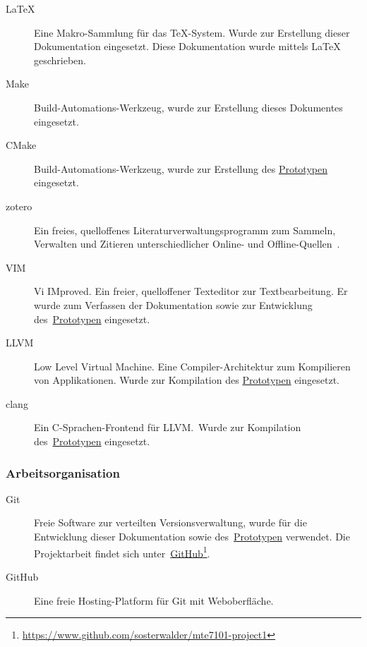 \begin{description}
    \item[\LaTeX] Eine Makro-Sammlung für das \TeX-System. Wurde zur
        Erstellung dieser Dokumentation eingesetzt. Diese Dokumentation
        wurde mittels \LaTeX{} geschrieben.
    \item[Make] Build-Automations-Werkzeug, wurde zur Erstellung dieses Dokumentes eingesetzt.
    \item[CMake] Build-Automations-Werkzeug, wurde zur Erstellung des
        \hyperref[chap:prototype]{Prototypen} eingesetzt.
    \item[zotero] Ein freies, quelloffenes Literaturverwaltungsprogramm
        zum Sammeln, Verwalten und Zitieren unterschiedlicher Online-
        und Offline-Quellen~\parencite{wikipedia_foundation_zotero_2015}.
    \item[VIM] Vi IMproved. Ein freier, quelloffener Texteditor zur
        Textbearbeitung. Er wurde zum Verfassen der Dokumentation sowie zur
        Entwicklung des~\hyperref[chap:prototype]{Prototypen} eingesetzt.
    \item[LLVM] Low Level Virtual Machine. Eine Compiler-Architektur zum
        Kompilieren von Applikationen. Wurde zur Kompilation des
        \hyperref[chap:prototype]{Prototypen} eingesetzt.
    \item[clang] Ein C-Sprachen-Frontend für LLVM.\ Wurde zur Kompilation
        des~\hyperref[chap:prototype]{Prototypen} eingesetzt.
\end{description}


\subsubsection{Arbeitsorganisation}
\label{ssubsec:tools_software:job_organisation}

\begin{description}
    \item[Git] Freie Software zur verteilten Versionsverwaltung, wurde
        für die Entwicklung dieser Dokumentation sowie
        des~\hyperref[chap:prototype]{Prototypen} verwendet. Die
        Projektarbeit findet sich
        unter~\href{https://www.github.com/sosterwalder/mte7101-project1}{GitHub}\footnote{
        \href{https://www.github.com/sosterwalder/mte7101-project1}{https://www.github.com/sosterwalder/mte7101-project1}
    }.
    \item[GitHub] Eine freie Hosting-Platform für Git mit Weboberfläche.
\end{description}

